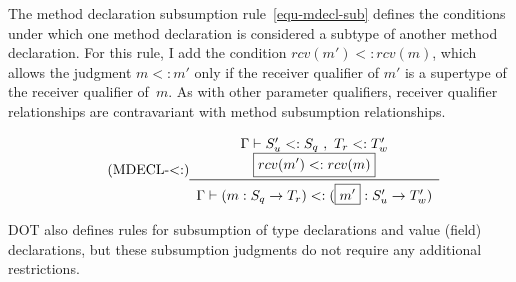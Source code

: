 The method declaration subsumption rule~\ref{equ-mdecl-sub}
defines the conditions under which one method declaration is considered
a subtype of another method declaration.
For this rule, I add the condition \mbox{$rcv(m')<:rcv(m)$},
which allows the judgment \mbox{$m<:m'$} only if
the receiver qualifier of $m'$ is a supertype of the
receiver qualifier of~$m$.
As with other parameter qualifiers, receiver qualifier relationships are contravariant
with method subsumption relationships.

\begin{equation*}\tag{MDECL-$<:$}\label{equ-mdecl-sub}
\begin{array}{c}
\Gamma \vdash S_u' <: S_q\ ,\ T_r <: T_w' \\
\boxed{rcv(m') <: rcv(m)} \\
\midrule
\Gamma \vdash (m : S_q \rightarrow T_r) <: (\boxed{m'} : S_u' \rightarrow T_w') \\
\end{array}
\end{equation*}

\vspace{0.4cm}

DOT also defines rules for subsumption of type declarations and value (field) declarations,
but these subsumption judgments do not require any additional restrictions.



